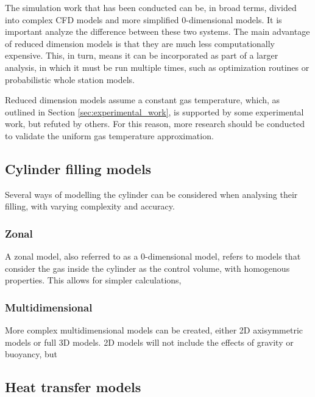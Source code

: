 The simulation work that has been conducted can be, in broad terms, divided into complex CFD models and more simplified 0-dimensional models. It is important analyze the difference between these two systems. The main advantage of reduced dimension models is that they are much less computationally expensive. This, in turn, means it can be incorporated as part of a larger analysis, in which it must be run multiple times, such as optimization routines or probabilistic whole station models.

Reduced dimension models assume a constant gas temperature, which, as outlined in Section \ref{sec:experimental_work}, is supported by some experimental work, but refuted by others. For this reason, more research should be conducted to validate the uniform gas temperature approximation.


\subsection{Cylinder filling models}

Several ways of modelling the cylinder can be considered when analysing their filling, with varying complexity and accuracy.

\subsubsection{Zonal}

A zonal model, also referred to as a 0-dimensional model, refers to models that consider the gas inside the cylinder as the control volume, with homogenous properties. This allows for simpler calculations, 

\subsubsection{Multidimensional}

More complex multidimensional models can be created, either 2D axisymmetric models or full 3D models. 2D models will not include the effects of gravity or buoyancy, but  

\label{sec:multidimensional}

\subsection{Heat transfer models}

